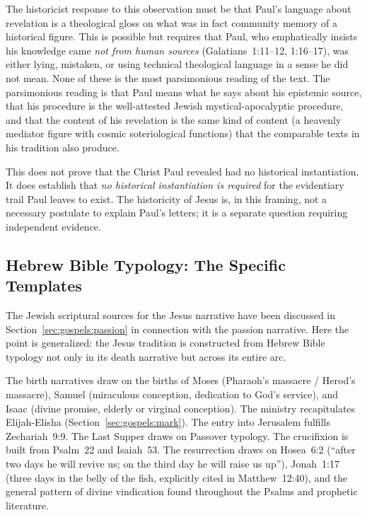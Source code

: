 \documentclass[12pt,oneside]{article}
\begin{document}
The historicist response to this observation must be that Paul's
language about revelation is a theological gloss on what was in fact
community memory of a historical figure.  This is possible but
requires that Paul, who emphatically insists his knowledge came
\textit{not from human sources} (Galatians~1:11--12, 1:16--17), was
either lying, mistaken, or using technical theological language in a
sense he did not mean.  None of these is the most parsimonious
reading of the text.  The parsimonious reading is that Paul means
what he says about his epistemic source, that his procedure is the
well-attested Jewish mystical-apocalyptic procedure, and that the
content of his revelation is the same kind of content (a heavenly
mediator figure with cosmic soteriological functions) that the
comparable texts in his tradition also produce.

This does not prove that the Christ Paul revealed had no historical
instantiation.  It does establish that \textit{no historical
instantiation is required} for the evidentiary trail Paul leaves to
exist.  The historicity of Jesus is, in this framing, not a
necessary postulate to explain Paul's letters; it is a separate
question requiring independent evidence.

\subsection{Hebrew Bible Typology: The Specific Templates}
\label{sec:myth:hb}

The Jewish scriptural sources for the Jesus narrative have been discussed
in Section~\ref{sec:gospels:passion} in connection with the passion
narrative.  Here the point is generalized: the Jesus tradition is
constructed from Hebrew Bible typology not only in its death narrative
but across its entire arc.

The birth narratives draw on the births of Moses (Pharaoh's massacre /
Herod's massacre), Samuel (miraculous conception, dedication to God's
service), and Isaac (divine promise, elderly or virginal conception).
The ministry recapitulates Elijah-Elisha (Section~\ref{sec:gospels:mark}).
The entry into Jerusalem fulfills Zechariah~9:9.  The Last Supper draws
on Passover typology.  The crucifixion is built from Psalm~22 and
Isaiah~53.  The resurrection draws on Hosea~6:2 (``after two days he
will revive us; on the third day he will raise us up''), Jonah~1:17
(three days in the belly of the fish, explicitly cited in Matthew~12:40),
and the general pattern of divine vindication found throughout the
Psalms and prophetic literature.
\end{document}
